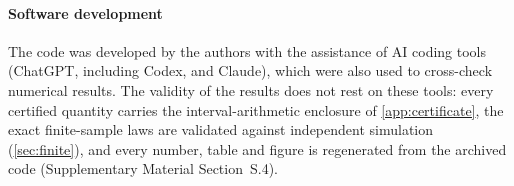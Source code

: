 \paragraph{Software development} The code was developed by the authors with the assistance of AI coding tools (ChatGPT,
including Codex, and Claude), which were also used to cross-check numerical results. The validity of the results does not rest on
these tools: every certified quantity carries the interval-arithmetic enclosure of \cref{app:certificate}, the exact
finite-sample laws are validated against independent simulation (\cref{sec:finite}), and every number, table and figure
is regenerated from the archived code (Supplementary Material Section~S.4).
